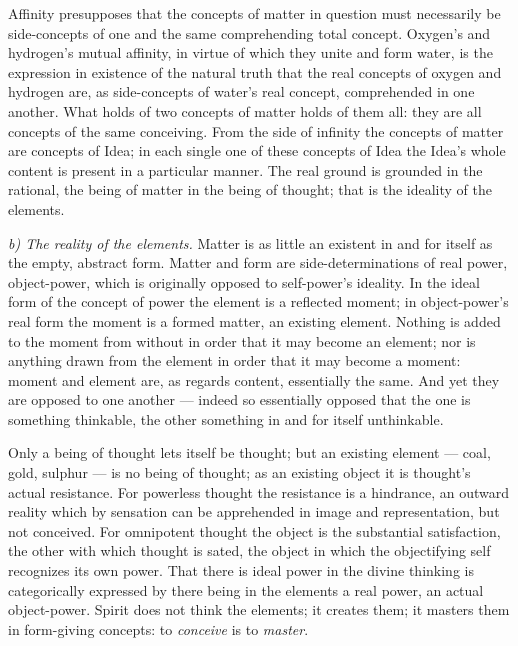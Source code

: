 \documentclass[12pt,a4paper]{book}
\newcommand{\runin}[1]{\emph{#1}\hspace{0.4em}}
\begin{document}
Affinity presupposes that the concepts of matter in question must necessarily be side-concepts of one and the same
comprehending total concept. Oxygen's and hydrogen's mutual affinity, in virtue of which they unite and form water, is
the expression in existence of the natural truth that the real concepts of oxygen and hydrogen are, as side-concepts of
water's real concept, comprehended in one another. What holds of two concepts of matter holds of them all: they are
all concepts of the same conceiving. From the side of infinity the concepts of matter are concepts of Idea; in each
single one of these concepts of Idea the Idea's whole content is present in a particular manner. The real ground is
grounded in the rational, the being of matter in the being of thought; that is the ideality of the elements.

\runin{b) The reality of the elements.} Matter is as little an existent in and for itself as the empty, abstract form.
Matter and form are side-determinations of real power, object-power, which is originally opposed to self-power's
ideality. In the ideal form of the concept of power the element is a reflected moment; in object-power's real form the
moment is a formed matter, an existing element. Nothing is added to the moment from without in order that it may
become an element; nor is anything drawn from the element in order that it may become a moment: moment and element
are, as regards content,
essentially the same. And yet they are opposed to one another --- indeed so essentially opposed that the one is
something thinkable, the other something in and for itself unthinkable.

Only a being of thought lets itself be thought; but an existing element --- coal, gold, sulphur --- is no being of
thought; as an existing object it is thought's actual resistance. For powerless thought the resistance is a hindrance,
an outward reality which by sensation can be apprehended in image and representation, but not conceived. For
omnipotent thought the object is the substantial satisfaction, the other with which thought is sated, the object in
which the objectifying self recognizes its own power. That there is ideal power in the divine thinking is categorically
expressed by there being in the elements a real power, an actual object-power. Spirit does not think the elements; it
creates them; it masters them in form-giving concepts: to \emph{conceive} is to \emph{master}.
\end{document}

